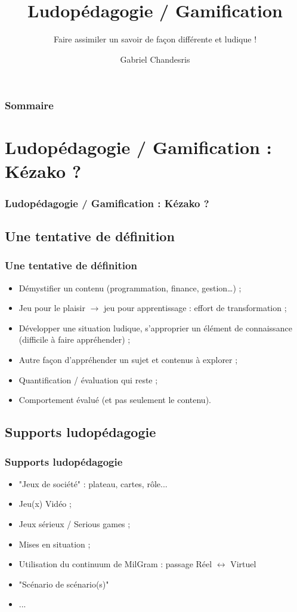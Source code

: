 \documentclass[slidetop,11pt]{beamer}
\title{Ludop{\'e}dagogie / Gamification }
\subtitle{Faire assimiler un savoir de fa\c{c}on diff{\'e}rente et ludique !}
\author{Gabriel Chandesris}
\institute{\emph{to be defined}} %
\begin{document}
\frame[plain]{\titlepage } 
%


\begin{frame}
	\frametitle{Sommaire}
	\small \tableofcontents[hideallsubsections]
\end{frame} 


\section{Ludop{\'e}dagogie / Gamification : K{\'e}zako ?}
\begin{frame}
	\frametitle{Ludop{\'e}dagogie / Gamification : K{\'e}zako ?}
	\tableofcontents[sections=1,currentsection,subsectionstyle=show/shaded/hide] %
\end{frame}


\subsection{Une tentative de d{\'e}finition}
\begin{frame}
	\frametitle{Une tentative de d{\'e}finition}
	\begin{itemize}
		\item D{\'e}mystifier un contenu (programmation, finance, gestion\ldots) ; 
		\item Jeu pour le plaisir $\rightarrow$ jeu pour apprentissage : effort de transformation ; 
		\item D{\'e}velopper une situation ludique, s'approprier un {\'e}l{\'e}ment de connaissance (difficile {\`a} faire appr{\'e}hender) ; 
		\item Autre fa\c{c}on d'appr{\'e}hender un sujet et contenus {\`a} explorer ; 
		\item Quantification / {\'e}valuation qui reste ; 
		\item Comportement {\'e}valu{\'e} (et pas seulement le contenu). 
	\end{itemize}
\end{frame}


\subsection{Supports ludop{\'e}dagogie}
\begin{frame}
	\frametitle{Supports ludop{\'e}dagogie}
	\begin{itemize}
		\item "Jeux de soci{\'e}t{\'e}" : plateau, cartes, r{\^o}le...
		\item Jeu(x) Vid{\'e}o ; 
		\item Jeux s{\'e}rieux / Serious games ; 
		\item Mises en situation ; 
		\item Utilisation du continuum de MilGram : passage R{\'e}el $\leftrightarrow$ Virtuel
		\item "Sc{\'e}nario de sc{\'e}nario(s)"
		\item ...
	\end{itemize}
\end{frame}
\end{document}
